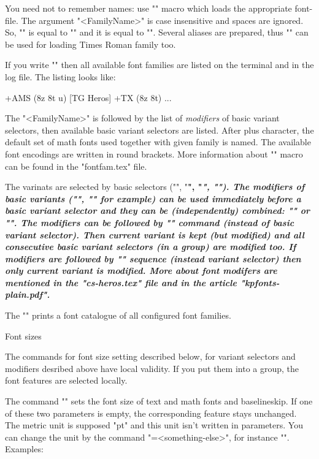 You need not to remember names: use
"\fontfam[<FamilyName>]" macro which loads the appropriate font-file. The
argument "<FamilyName>" is case insensitive and spaces are ignored. So,
"" is equal to "\fontfam[TimesRoman]" and it is equal
to "\fontfam[timesroman]". Several aliases are prepared, thus
"\fontfam[times]" can be used for loading Times Roman family too.

If you write "\fontfam[?]" then all available font families are listed on
the terminal and in the log file. The listing looks like:

 {\rm \bf \it \bi } +AMS (8z 8t u)
[TG Heros]  {\caps \cond} {\rm \bf \it \bi } +TX (8z 8t)
 ...
\endtt

The "<FamilyName>" is followed by the list of {\em modifiers} of basic
variant selectors, then available basic variant selectors are listed. After
plus character, the default set of math fonts used together with given
family is named. The available font encodings are written in round brackets.
More information about "\fontfam" macro can be found in the "fontfam.tex"
file.

The varinats are selected by basic selectors ("\rm", "\bf", "\it", "\bi").
The modifiers of basic variants ("\caps", "\cond" for example) can
be used immediately before a basic variant selector and they
can be (independently) combined: "\caps\it" or "\cond\caps\bf". The
modifiers can be followed by "\fam" command (instead of basic variant
selector). Then current variant is kept (but modified) and all consecutive
basic variant selectors (in a group) are modified too. 
If modifiers are followed by "\one" sequence (instead variant selector) 
then only current variant is modified. More about font modifers are
mentioned in the "cs-heros.tex" file and in the article "kpfonts-plain.pdf".

The "\fontfam[Catalog]" prints a font catalogue of all configured font
families.


\sec Font sizes

The commands for font size setting described below, for variant selectors and
modifiers desribed above have local validity. If you put them into a group, 
the font features are selected locally.

The command "" sets the font size of text and
math fonts and baselineskip. If one of these two parameters is empty, the
corresponding feature stays unchanged. The metric unit is supposed "pt" and
this unit isn't written in parameters. You can change the unit by the
command "\ptunit=<something-else>", for instance "\ptunit=1mm".
Examples:


